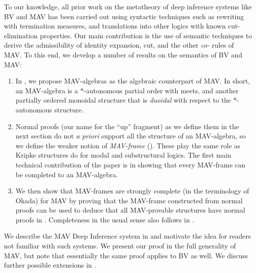 To our knowledge, all prior work on the metatheory of deep inference systems like BV and MAV has been carried out using syntactic techniques such as rewriting with termination measures, and translations into other logics with known cut-elimination properties. Our main contribution is the use of semantic techniques to derive the admissibility of identity expansion, cut, and the other \emph{co-} rules of MAV. To this end, we develop a number of results on the semantics of BV and MAV:
\begin{enumerate}
\item In , we propose MAV-algebras as the algebraic counterpart of MAV. In short, an MAV-algebra is a $*$-autonomous partial order with meets, and another partially ordered monoidal structure that is \emph{duoidal} with respect to the $*$-autonomous structure.
\item Normal proofs (our name for the ``up'' fragment) as we define them in the next section do not {\it a priori} support all the structure of an MAV-algebra, so we define the weaker notion of \emph{MAV-frame} (). These play the same role as Kripke structures do for modal and substructural logics. The first main technical contribution of the paper is in showing that every MAV-frame can be completed to an MAV-algebra.
\item We then show that MAV-frames are strongly complete (in the terminology of Okada) for MAV by proving that the MAV-frame constructed from normal proofs can be used to deduce that all MAV-provable structures have normal proofs in . Completeness in the usual sense also follows in .
\end{enumerate}

We describe the MAV Deep Inference system in  and motivate the idea for readers not familiar with such systems. We present our proof in the full generality of MAV, but note that essentially the same proof applies to BV as well. We discuss further possible extensions in .
